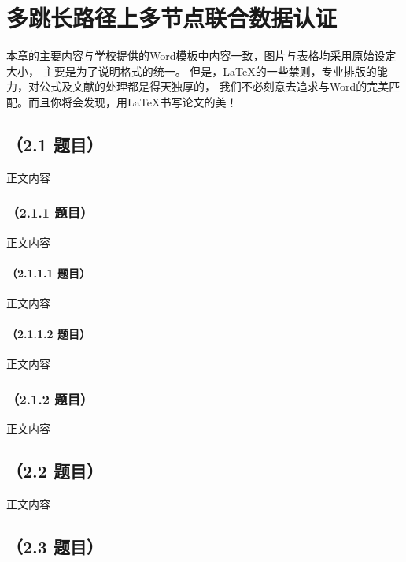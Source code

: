 \chapter{多跳长路径上多节点联合数据认证}

本章的主要内容与学校提供的Word模板中内容一致，图片与表格均采用原始设定大小，%
主要是为了说明格式的统一。%
但是，\LaTeX{}的一些禁则，专业排版的能力，对公式及文献的处理都是得天独厚的，%
我们不必刻意去追求与Word的完美匹配。而且你将会发现，用\LaTeX{}书写论文的美！ %

\section{（2.1 题目）}
正文内容

\subsection{（2.1.1 题目）}
正文内容

\subsubsection{（2.1.1.1 题目）}
正文内容

\subsubsection{（2.1.1.2 题目）}
正文内容

\subsection{（2.1.2 题目）}
正文内容


\section{（2.2 题目）}
正文内容

\section{（2.3 题目）}

